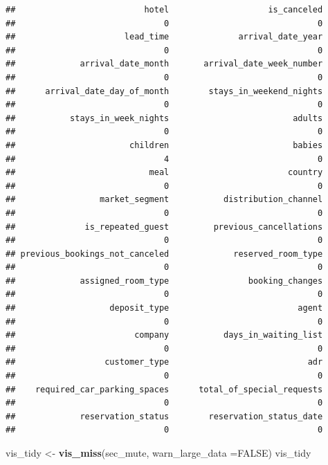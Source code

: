 \documentclass[11pt,a4paper,]{article}
\newenvironment{Shaded}{\begin{snugshade}}{\end{snugshade}}
\newcommand{\DataTypeTok}[1]{\textcolor[rgb]{0.13,0.29,0.53}{#1}}
\newcommand{\KeywordTok}[1]{\textcolor[rgb]{0.13,0.29,0.53}{\textbf{#1}}}
\newcommand{\NormalTok}[1]{#1}
\newcommand{\OtherTok}[1]{\textcolor[rgb]{0.56,0.35,0.01}{#1}}
\newcommand{\StringTok}[1]{\textcolor[rgb]{0.31,0.60,0.02}{#1}}
\begin{document}
\begin{verbatim}
##                          hotel                    is_canceled 
##                              0                              0 
##                      lead_time              arrival_date_year 
##                              0                              0 
##             arrival_date_month       arrival_date_week_number 
##                              0                              0 
##      arrival_date_day_of_month        stays_in_weekend_nights 
##                              0                              0 
##           stays_in_week_nights                         adults 
##                              0                              0 
##                       children                         babies 
##                              4                              0 
##                           meal                        country 
##                              0                              0 
##                 market_segment           distribution_channel 
##                              0                              0 
##              is_repeated_guest         previous_cancellations 
##                              0                              0 
## previous_bookings_not_canceled             reserved_room_type 
##                              0                              0 
##             assigned_room_type                booking_changes 
##                              0                              0 
##                   deposit_type                          agent 
##                              0                              0 
##                        company           days_in_waiting_list 
##                              0                              0 
##                  customer_type                            adr 
##                              0                              0 
##    required_car_parking_spaces      total_of_special_requests 
##                              0                              0 
##             reservation_status        reservation_status_date 
##                              0                              0
\end{verbatim}

\begin{Shaded}
\begin{Highlighting}[]
\NormalTok{vis\_tidy \textless{}{-}}\StringTok{ }\KeywordTok{vis\_miss}\NormalTok{(sec\_mute, }\DataTypeTok{warn\_large\_data =}\OtherTok{FALSE}\NormalTok{)}
\NormalTok{vis\_tidy}
\end{Highlighting}
\end{Shaded}
\end{document}
